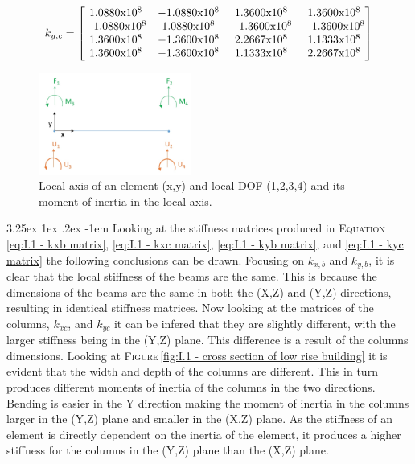 \documentclass[11pt,a4paper,titlepage]{report}
\makeatletter
\renewcommand\paragraph{\@startsection{paragraph}{5}{\z@}%
  {3.25ex \@plus1ex \@minus.2ex}%
  {-1em}%
  {\normalfont\normalsize\bfseries}}
\makeatother
\begin{document}
\begin{equation}
k_{y,c}=
\left[
    \begin{matrix}
     1.0880$x$10^8 & -1.0880$x$10^8 & 1.3600$x$10^8 & 1.3600$x$10^8\\
   -1.0880$x$10^8 & 1.0880$x$10^8 & -1.3600$x$10^8 & -1.3600$x$10^8\\
    1.3600$x$10^8 & -1.3600$x$10^8 & 2.2667$x$10^8 & 1.1333$x$10^8\\
    1.3600$x$10^8 & -1.3600$x$10^8 & 1.1333$x$10^8 & 2.2667$x$10^8\\
    \end{matrix}
\right]
\label{eq:I.1 - kyc matrix}
\end{equation}
\begin{figure} [h]
    \centering
    \includegraphics[width=5cm]{Localized_DOF.jpeg}
    \caption{Local axis of an element (x,y) and local DOF (1,2,3,4) and its moment of inertia in the local axis.}
    \label{fig : I.1 - local axis LowRB}
\end{figure}
\paragraph{}Looking at the stiffness matrices produced in \textsc{Equation}\,\eqref{eq:I.1 - kxb matrix}, \eqref{eq:I.1 - kxc matrix}, \eqref{eq:I.1 - kyb matrix}, and \eqref{eq:I.1 - kyc matrix} the following conclusions can be drawn. Focusing on $k_{x,b}$ and $k_{y,b}$, it is clear that the local stiffness of the beams are the same. This is because the dimensions of the beams are the same in both the (X,Z) and (Y,Z) directions, resulting in identical stiffness matrices. Now looking at the matrices of the columns, $k_{xc}$, and $k_{yc}$ it can be infered that they are slightly different, with the larger stiffness being in the (Y,Z) plane. This difference is a result of the columns dimensions. Looking at \textsc{Figure}\,\ref{fig:I.1 - cross section of low rise building} it is evident that the width and depth of the columns are different. This in turn produces different moments of inertia of the columns in the two directions. Bending is easier in the Y direction making the moment of inertia in the columns larger in the (Y,Z) plane and smaller in the (X,Z) plane. As the stiffness of an element is directly dependent on the inertia of the element, it produces a higher stiffness for the columns in the (Y,Z) plane than the (X,Z) plane. 
\end{document}
